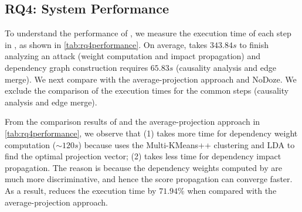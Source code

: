 %



\subsection{RQ4: System Performance}

To understand the performance of \tool, we measure the execution time of each step in \tool, as shown in \cref{tab:rq4performance}.
On average, \tool takes $343.84s$ to finish
analyzing an attack (\ie weight computation and impact propagation) and dependency graph construction requires $65.83s$ (\ie causality analysis and edge merge).
We next compare \tool with the average-projection approach and NoDoze.
We exclude the comparison of the execution times for the common steps (causality analysis and edge merge).


From the comparison results of \tool and the average-projection approach in \cref{tab:rq4performance}, we observe that 
(1) \tool takes more time for dependency weight computation ($\sim120s$) because \tool uses the Multi-KMeans++ clustering and LDA to find the optimal projection vector;
(2) \tool takes less time for dependency impact propagation. The reason is because the dependency weights computed by \tool are much more discriminative, and hence the score propagation can converge faster.
As a result, \tool reduces the execution time by $71.94\%$ when compared with the average-projection approach. 

